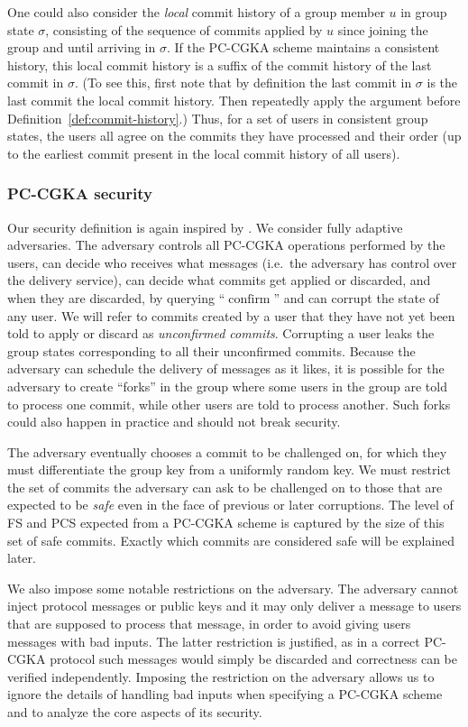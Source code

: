 One could also consider the \emph{local} commit history of a group member $u$ in group state $\sigma$, consisting of the sequence of commits applied by $u$ since joining the group and until arriving in $\sigma$. If the PC-CGKA scheme maintains a consistent history, this local commit history is a suffix of the commit history of the last commit in $\sigma$. (To see this, first note that by definition the last commit in $\sigma$ is the last commit the local commit history. Then repeatedly apply the argument before Definition~\ref{def:commit-history}.) Thus, for a set of users in consistent group states, the users all agree on the commits they have processed and their order (up to the earliest commit present in the local commit history of all users).

\subsubsection{PC-CGKA security}

Our security definition is again inspired by \cite{ttkem}. We consider fully adaptive adversaries. The adversary controls all PC-CGKA operations performed by the users, can decide who receives what messages (i.e.\ the adversary has control over the delivery service), can decide what commits get applied or discarded, and when they are discarded, by querying ``$\operatorname{confirm}$'' and can corrupt the state of any user. We will refer to commits created by a user that they have not yet been told to apply or discard as \emph{unconfirmed commits}. Corrupting a user leaks the group states corresponding to all their unconfirmed commits. Because the adversary can schedule the delivery of messages as it likes, it is possible for the adversary to create ``forks'' in the group where some users in the group are told to process one commit, while other users are told to process another. Such forks could also happen in practice and should not break security.

The adversary eventually chooses a commit to be challenged on, for which they must differentiate the group key from a uniformly random key. We must restrict the set of commits the adversary can ask to be challenged on to those that are expected to be \emph{safe} even in the face of previous or later corruptions. The level of FS and PCS expected from a PC-CGKA scheme is captured by the size of this set of safe commits. Exactly which commits are considered safe will be explained later.

We also impose some notable restrictions on the adversary. The adversary cannot inject protocol messages or public keys and it may only deliver a message to users that are supposed to process that message, in order to avoid giving users messages with bad inputs. The latter restriction is justified, as in a correct PC-CGKA protocol such messages would simply be discarded and correctness can be verified independently. Imposing the restriction on the adversary allows us to ignore the details of handling bad inputs when specifying a PC-CGKA scheme and to analyze the core aspects of its security.

